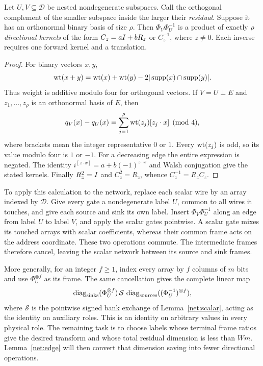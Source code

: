 \begin{lemma}\label{net:edge}
Let $U,V\subseteq\mathcal D$ be nested nondegenerate subspaces.
Call the orthogonal complement of the smaller subspace inside the
larger their \emph{residual}.  Suppose it has an orthonormal binary
basis of size $\rho$.
Then $\Phi_V\Phi_U^{-1}$ is a product of exactly $\rho$
\emph{directional kernels} of the form $C_z=aI+bR_z$ or $C_z^{-1}$,
where $z\ne0$.  Each inverse requires one forward kernel and a
translation.
\end{lemma}

\begin{proof}
For binary vectors $x,y$,
\[
 \operatorname{wt}(x+y)=\operatorname{wt}(x)+\operatorname{wt}(y)-2|\operatorname{supp}(x)\cap\operatorname{supp}(y)|.
\]
Thus weight is additive modulo four for orthogonal vectors.
If $V=U\mathbin\perp E$ and $z_1,\ldots,z_\rho$ is an
orthonormal basis of $E$, then
\[
 q_V(x)-q_U(x)
   =\sum_{j=1}^{\rho}\operatorname{wt}(z_j)[z_j\cdot x]\pmod4,
\]
where brackets mean the integer representative $0$ or $1$.
Every $\operatorname{wt}(z_j)$ is odd, so its value modulo four is $1$ or $-1$.
For a decreasing edge the entire expression is negated.
The identity
$i^{[z\cdot x]}=a+b(-1)^{z\cdot x}$ and Walsh conjugation
give the stated kernels.  Finally $R_z^2=I$ and
$C_z^2=R_z$, whence $C_z^{-1}=R_zC_z$.
\end{proof}

To apply this calculation to the network, replace each scalar wire by
an array indexed by $\mathcal D$.  Give every gate a nondegenerate label
$U$, common to all wires it touches, and give each source and sink its
own label.  Insert $\Phi_V\Phi_U^{-1}$ along an edge from label $U$ to
label $V$, and apply the scalar gates pointwise.  A scalar gate mixes
its touched arrays with scalar coefficients, whereas their common
frame acts on the address coordinate.  These two operations commute.
The intermediate frames therefore cancel, leaving the scalar network
between its source and sink frames.

More generally, for an integer $f\ge1$, index every array by $f$ columns
of $m$ bits and use $\Phi_U^{\otimes f}$ as its frame.  The same
cancellation gives the complete linear map
\begin{equation}\label{net:telescoping}
 \operatorname{diag}_{\mathrm{sinks}}(\Phi_U^{\otimes f})\,
 \mathcal S\,
 \operatorname{diag}_{\mathrm{sources}}((\Phi_U^{-1})^{\otimes f}),
\end{equation}
where $\mathcal S$ is the pointwise signed bank exchange of
Lemma~\ref{net:scalar}, acting as the identity on auxiliary roles.
This is an identity on arbitrary values in every physical role.
The remaining task is to choose labels whose terminal frame ratios
give the desired transform and whose total residual dimension is less
than $Wm$.  Lemma~\ref{net:edge} will then convert that dimension
saving into fewer directional operations.

